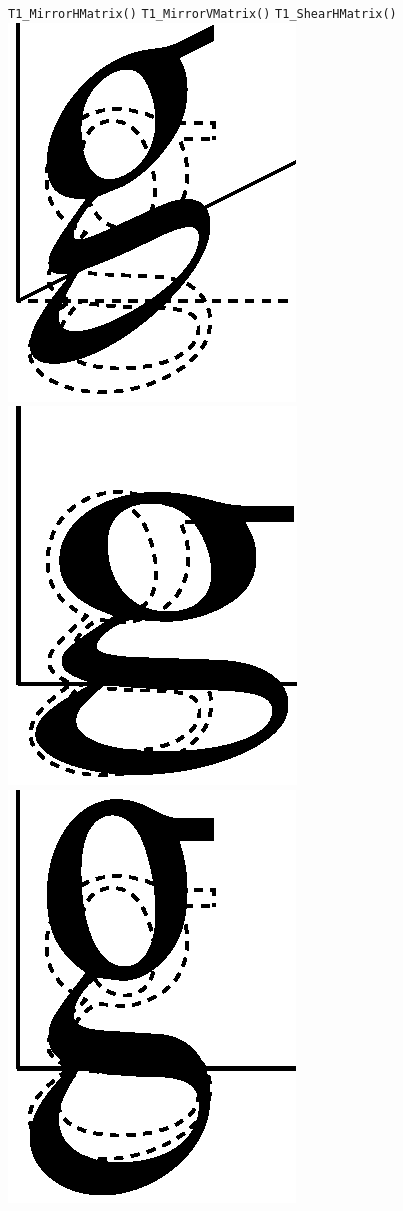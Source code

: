 \begin{figure}[t]
\hfill\break
\noindent\vrule width 0pt\hfill\verb+T1_MirrorHMatrix()+\hfill
\verb+T1_MirrorVMatrix()+\hfill
\verb+T1_ShearHMatrix()+\hfill\break
\vskip0.5cm
\hfill
\includegraphics[scale=0.5]{shearv.eps}
\hfill
\includegraphics[scale=0.5]{extenth.eps}
\hfill
\includegraphics[scale=0.5]{extentv.eps}

\end{figure}
